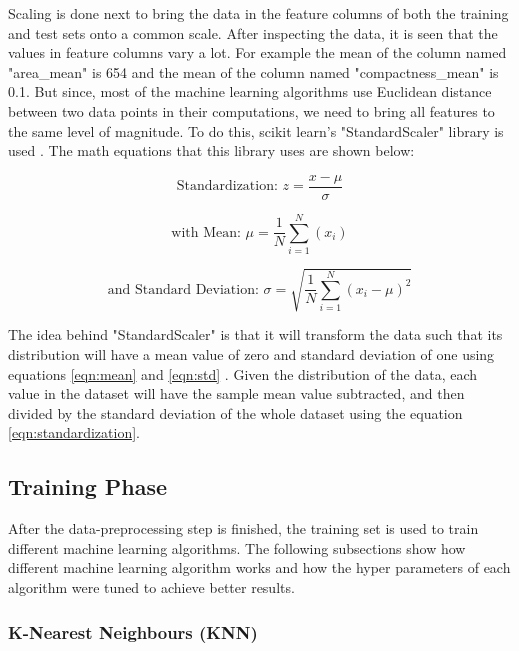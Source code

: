 \documentclass[journal]{IEEEtran}
\begin{document}
Scaling is done next to bring the data in the feature columns of both the training and test sets onto a common scale. After inspecting the data, it is seen that the values in feature columns vary a lot. For example the mean of the column named "area\_mean" is 654 and the mean of the column named "compactness\_mean" is 0.1. But since, most of the machine learning algorithms use Euclidean distance between two data points in their computations, we need to bring all features to the same level of magnitude. To do this, scikit learn's "StandardScaler" library is used \cite{scaler}. The math equations that this library uses are shown below:

\begin{equation}
\label{eqn:standardization}
\textrm{Standardization: }
z = \frac{x - \mu}{\sigma}
\end{equation}

\begin{equation}
\label{eqn:mean}
\textrm{with Mean: }
\mu = \frac{1}{N} \sum\limits_{i=1}^N (x_i) 
\end{equation}

\begin{equation}
\label{eqn:std}
\textrm{and Standard Deviation: }
\sigma = \sqrt{\frac{1}{N} \sum\limits_{i=1}^N(x_i - \mu)^2}
\end{equation}

The idea behind "StandardScaler" is that it will transform the data such that its distribution will have a mean value of zero and standard deviation of one using equations \ref{eqn:mean} and \ref{eqn:std} . Given the distribution of the data, each value in the dataset will have the sample mean value subtracted, and then divided by the standard deviation of the whole dataset using the equation \ref{eqn:standardization}.


\subsection{Training Phase}

After the data-preprocessing step is finished, the training set is used to train different machine learning algorithms. The following subsections show how different machine learning algorithm works and how the hyper parameters of each algorithm were tuned to achieve better results.\\

\subsubsection{K-Nearest Neighbours (KNN)}
\end{document}
